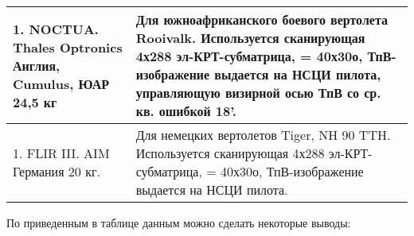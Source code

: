 \begin{landscape}
\begin{longtable}{| p{6cm} | p{18cm} |}
\\ \hline
	1.	NOCTUA. Thales Optronics	Англия, Cumulus, ЮАР		24,5 кг       
& 
Для южноафриканского боевого вертолета Rooivalk. Используется сканирующая 4х288 эл-КРТ-субматрица, = 40х30о, ТпВ-изображение выдается на НСЦИ пилота, управляющую визирной осью ТпВ со ср. кв. ошибкой 18'.     
\\ \hline
	1.	FLIR III. AIM	Германия		20 кг.       
& 
Для немецких вертолетов Tiger, NH 90 TTH. Используется сканирующая 4х288 эл-КРТ-субматрица, = 40х30о, ТпВ-изображение выдается на НСЦИ пилота.     
\\ \hline

\end{longtable}

\end{landscape}

По приведенным в таблице данным можно сделать некоторые выводы: 


